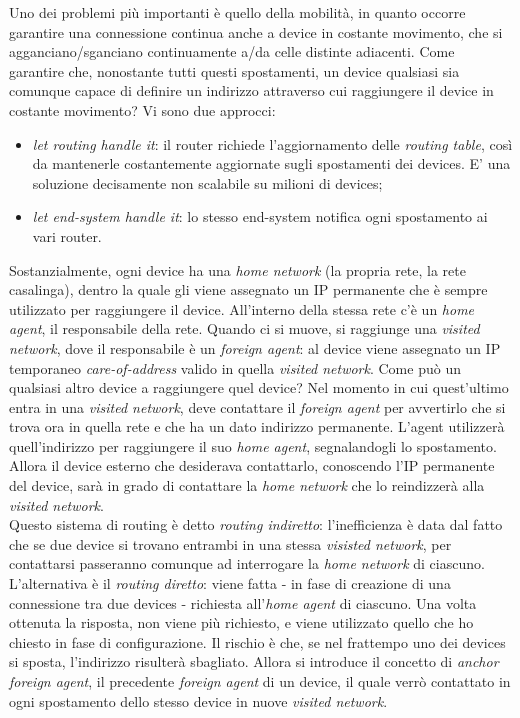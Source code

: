 Uno dei problemi più importanti è quello della mobilità, in quanto occorre garantire una connessione continua anche a device in costante movimento, che si agganciano/sganciano continuamente a/da celle distinte adiacenti. Come garantire che, nonostante tutti questi spostamenti, un device qualsiasi sia comunque capace di definire un indirizzo attraverso cui raggiungere il device in costante movimento? Vi sono due approcci:
\begin{itemize}
	\item \textit{let routing handle it}: il router richiede l'aggiornamento delle \textit{routing table}, così da mantenerle costantemente aggiornate sugli spostamenti dei devices. E' una soluzione decisamente non scalabile su milioni di devices;
	\item \textit{let end-system handle it}: lo stesso end-system notifica ogni spostamento ai vari router.
\end{itemize}
Sostanzialmente, ogni device ha una \textit{home network} (la propria rete, la rete casalinga), dentro la quale gli viene assegnato un IP permanente che è sempre utilizzato per raggiungere il device. All'interno della stessa rete c'è un \textit{home agent}, il responsabile della rete. Quando ci si muove, si raggiunge una \textit{visited network}, dove il responsabile è un \textit{foreign agent}: al device viene assegnato un IP temporaneo \textit{care-of-address} valido in quella \textit{visited network}. Come può un qualsiasi altro device a raggiungere quel device? Nel momento in cui quest'ultimo entra in una \textit{visited network}, deve contattare il \textit{foreign agent} per avvertirlo che si trova ora in quella rete e che ha un dato indirizzo permanente. L'agent utilizzerà quell'indirizzo per raggiungere il suo \textit{home agent}, segnalandogli lo spostamento. Allora il device esterno che desiderava contattarlo, conoscendo l'IP permanente del device, sarà in grado di contattare la \textit{home network} che lo reindizzerà alla \textit{visited network}. \\
Questo sistema di routing è detto \textit{routing indiretto}: l'inefficienza è data dal fatto che se due device si trovano entrambi in una stessa \textit{visisted network}, per contattarsi passeranno comunque ad interrogare la \textit{home network} di ciascuno. L'alternativa è il \textit{routing diretto}: viene fatta - in fase di creazione di una connessione tra due devices - richiesta all'\textit{home agent} di ciascuno. Una volta ottenuta la risposta, non viene più richiesto, e viene utilizzato quello che ho chiesto in fase di configurazione. Il rischio è che, se nel frattempo uno dei devices si sposta, l'indirizzo risulterà sbagliato. Allora si introduce il concetto di \textit{anchor foreign agent}, il precedente \textit{foreign agent} di un device, il quale verrò contattato in ogni spostamento dello stesso device in nuove \textit{visited network}.

